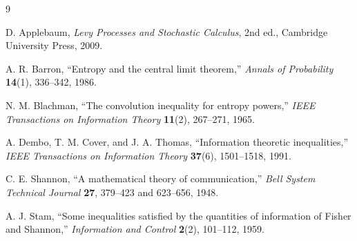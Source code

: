 \documentclass[10pt]{article}
\begin{document}
{\small
\setlength{\parskip}{0.12em}
\begin{thebibliography}{9}
\setlength{\itemsep}{0.08em}

D. Applebaum, \emph{Levy Processes and Stochastic Calculus}, 2nd ed.,
Cambridge University Press, 2009.

A. R. Barron, ``Entropy and the central limit theorem,''
\emph{Annals of Probability} \textbf{14}(1), 336--342, 1986.

N. M. Blachman, ``The convolution inequality for entropy powers,''
\emph{IEEE Transactions on Information Theory} \textbf{11}(2), 267--271, 1965.

A. Dembo, T. M. Cover, and J. A. Thomas, ``Information theoretic inequalities,''
\emph{IEEE Transactions on Information Theory} \textbf{37}(6), 1501--1518, 1991.

C. E. Shannon, ``A mathematical theory of communication,''
\emph{Bell System Technical Journal} \textbf{27}, 379--423 and 623--656, 1948.

A. J. Stam, ``Some inequalities satisfied by the quantities of information of
Fisher and Shannon,'' \emph{Information and Control} \textbf{2}(2), 101--112, 1959.

\end{thebibliography}
}
\end{document}
